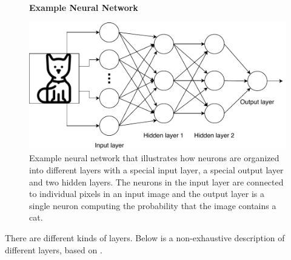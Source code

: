 \begin{figure}
    \centering
    \textbf{Example Neural Network}\par\medskip
    \includegraphics[width=\textwidth]{./pictures/method/example_neural_network}
    \caption{Example neural network that illustrates how neurons are organized
        into different layers with a special input layer, a special output layer
        and two hidden layers. The neurons in the input layer are connected to
        individual pixels in an input image and the output layer is a single
        neuron computing the probability that the image contains a cat.}
    \label{fig:example_nn}
\end{figure}

There are different kinds of layers. Below is a
non-exhaustive description of different layers, based on
\citep{oshea2015,DBLP:series/sci/2012-385,Goodfellow-et-al-2016,
mikolov2013linguistic,JMLR:v15:srivastava14a}.

